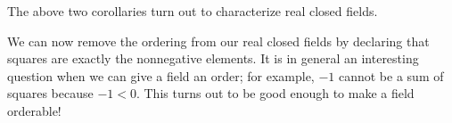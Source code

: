 \documentclass[../notes.tex]{subfiles}
\begin{document}
The above two corollaries turn out to characterize real closed fields.
\begin{remark}
	We can now remove the ordering from our real closed fields by declaring that squares are exactly the nonnegative elements. It is in general an interesting question when we can give a field an order; for example, $-1$ cannot be a sum of squares because $-1<0$. This turns out to be good enough to make a field orderable!
\end{remark}
\end{document}
